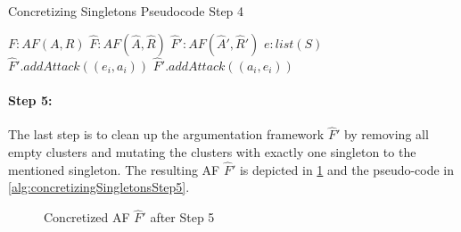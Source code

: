 \begin{algorithm}[H]
    \caption{Concretizing Singletons Pseudocode Step 4}\label{alg:concretizingSingletonsStep4}
    \begin{algorithmic}[1]
        \Require $F: AF(A, R)$ 
        \Require $\hat{F}: AF(\hat{A}, \hat{R})$ 
        \Require $\hat{F}': AF(\hat{A}', \hat{R}')$ 
        \Require $e: list(S)$ 
                    \State $\hat{F}'.addAttack((e_i, a_i))$
                \EndIf
            \EndFor
                    \State $\hat{F}'.addAttack((a_i, e_i))$
                \EndIf
            \EndFor
        \EndFor
    \end{algorithmic}
\end{algorithm}


\paragraph{Step 5:} The last step is to clean up the argumentation framework $\hat{F}'$ by removing all empty clusters and mutating the clusters with exactly
one singleton to the mentioned singleton. The resulting AF $\hat{F}'$ is depicted in \cref{example:algorithmConcretizeSingletonsStep5} and the pseudo-code in \cref{alg:concretizingSingletonsStep5}.


\vspace{0.3cm}
\begin{figure}[h!]
    \centering
    \caption{Concretized AF $\hat{F}'$ after Step 5}
    \label{example:algorithmConcretizeSingletonsStep5}
\end{figure}
\vspace{-0.2cm}


